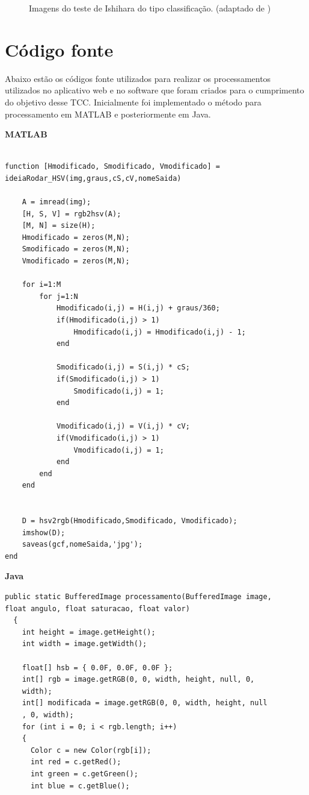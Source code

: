 \documentclass[	12pt, Times, openright, twoside, a4paper, english, brazil]{abntex2}
\begin{document}
\begin{apendicesenv}
\begin{figure}[!htb]
\caption{Imagens do teste de Ishihara do tipo classificação. (adaptado de )}
\label{fig:apendiceClassificacao}

\end{figure}

\chapter{Código fonte}
\label{ap:codigo}

Abaixo estão os códigos fonte utilizados para realizar os processamentos utilizados no aplicativo web e no software que foram criados para o  cumprimento do objetivo desse TCC. Inicialmente foi implementado o método para processamento em MATLAB e posteriormente em Java.


\textbf{MATLAB}
\begin{lstlisting}

function [Hmodificado, Smodificado, Vmodificado] = 
ideiaRodar_HSV(img,graus,cS,cV,nomeSaida)

    A = imread(img);
    [H, S, V] = rgb2hsv(A);  
    [M, N] = size(H);    
    Hmodificado = zeros(M,N);
    Smodificado = zeros(M,N);
    Vmodificado = zeros(M,N);

    for i=1:M
        for j=1:N
            Hmodificado(i,j) = H(i,j) + graus/360;
            if(Hmodificado(i,j) > 1)
                Hmodificado(i,j) = Hmodificado(i,j) - 1;
            end
       
            Smodificado(i,j) = S(i,j) * cS;
            if(Smodificado(i,j) > 1)
                Smodificado(i,j) = 1;
            end
    
            Vmodificado(i,j) = V(i,j) * cV;
            if(Vmodificado(i,j) > 1)
                Vmodificado(i,j) = 1;
            end
        end
    end
        
    
    D = hsv2rgb(Hmodificado,Smodificado, Vmodificado);
    imshow(D);
    saveas(gcf,nomeSaida,'jpg');
end

\end{lstlisting}

\textbf{Java}
\begin{lstlisting}
public static BufferedImage processamento(BufferedImage image, 
float angulo, float saturacao, float valor)
  {
    int height = image.getHeight();
    int width = image.getWidth();
    
    float[] hsb = { 0.0F, 0.0F, 0.0F };
    int[] rgb = image.getRGB(0, 0, width, height, null, 0,
    width);
    int[] modificada = image.getRGB(0, 0, width, height, null
    , 0, width);
    for (int i = 0; i < rgb.length; i++)
    {
      Color c = new Color(rgb[i]);
      int red = c.getRed();
      int green = c.getGreen();
      int blue = c.getBlue();
      

\end{lstlisting}
\end{apendicesenv}
\end{document}
